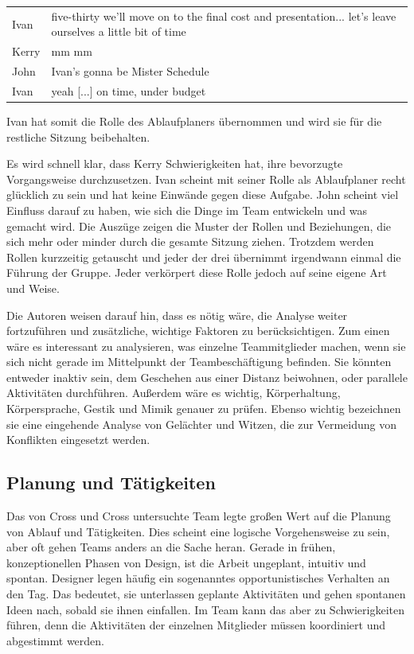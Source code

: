 \begin{extract}[John bestätigt Ivan erneut in seiner Rolle.]
	{
		\myfloatalign
		\begin{tabularx}{\textwidth}{p{1cm}X}
    		Ivan & five-thirty we'll move on to the final cost and presentation... let's leave ourselves a little bit of time \\
			Kerry & mm mm \\
			John & Ivan's gonna be Mister Schedule \\
			Ivan & yeah [...] on time, under budget
		\end{tabularx}
	}
\end{extract}

Ivan hat somit die Rolle des Ablaufplaners übernommen und wird sie für die restliche Sitzung beibehalten.

\medskip Es wird schnell klar, dass Kerry Schwierigkeiten hat, ihre bevorzugte Vorgangsweise durchzusetzen. Ivan scheint mit seiner Rolle als Ablaufplaner recht glücklich zu sein und hat keine Einwände gegen diese Aufgabe. John scheint viel Einfluss darauf zu haben, wie sich die Dinge im Team entwickeln und was gemacht wird. Die Auszüge zeigen die Muster der Rollen und Beziehungen, die sich mehr oder minder durch die gesamte Sitzung ziehen. Trotzdem werden Rollen kurzzeitig getauscht und jeder der drei übernimmt irgendwann einmal die Führung der Gruppe. Jeder verkörpert diese Rolle jedoch auf seine eigene Art und Weise.

Die Autoren weisen darauf hin, dass es nötig wäre, die Analyse weiter fortzuführen und zusätzliche, wichtige Faktoren zu berücksichtigen. Zum einen wäre es interessant zu analysieren, was einzelne Teammitglieder machen, wenn sie sich nicht gerade im Mittelpunkt der Teambeschäftigung befinden. Sie könnten entweder inaktiv sein, dem Geschehen aus einer Distanz beiwohnen, oder parallele Aktivitäten durchführen. Außerdem wäre es wichtig, Körperhaltung, Körpersprache, Gestik und Mimik genauer zu prüfen. Ebenso wichtig bezeichnen sie eine eingehende Analyse von Gelächter und Witzen, die zur Vermeidung von Konflikten eingesetzt werden.

\subsection{Planung und Tätigkeiten}\label{sec:collabActions} 

Das von Cross und Cross untersuchte Team legte großen Wert auf die Planung von Ablauf und Tätigkeiten. Dies scheint eine logische Vorgehensweise zu sein, aber oft gehen Teams anders an die Sache heran. Gerade in frühen, konzeptionellen Phasen von Design, ist die Arbeit ungeplant, intuitiv und spontan. Designer legen häufig ein sogenanntes opportunistisches Verhalten an den Tag. Das bedeutet, sie unterlassen geplante Aktivitäten und gehen spontanen Ideen nach, sobald sie ihnen einfallen. Im Team kann das aber zu Schwierigkeiten führen, denn die Aktivitäten der einzelnen Mitglieder müssen koordiniert und abgestimmt werden. 


